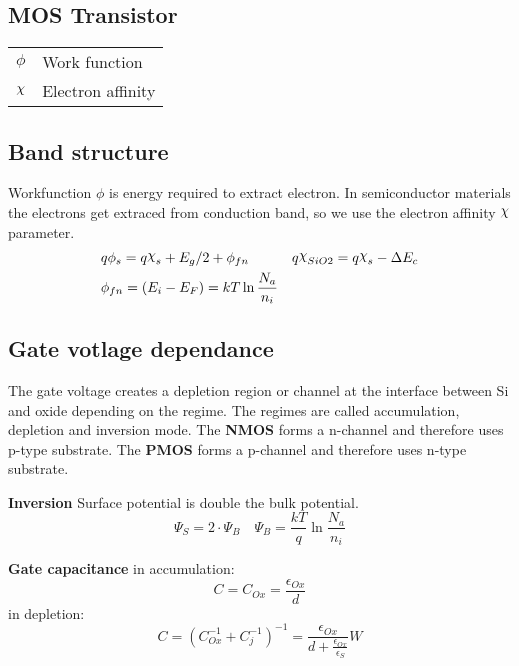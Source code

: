 \documentclass[a4paper, fontsize=8pt, landscape, DIV=1]{scrartcl}
\begin{document}
\begin{multicols*}{4}
    \section{MOS Transistor}
    \ifdefined\makeultracompact
    \else
      \begin{tabular}[h]{l l}
        $\phi$   & Work function \\
        $\altchi$    & Electron affinity \\
      \end{tabular}
    \fi

    \subsection{Band structure}
    Workfunction $\phi$ is energy required to extract electron. 
    In semiconductor materials the electrons get extraced from conduction band, so we use
    the electron affinity $\altchi$ parameter.
    \begin{align*}
      &q\phi_s = q\altchi_s + E_g/2 + \phi_{fn} & q\altchi_{SiO2} = q\altchi_s - \Delta E_c \\
      &\phi_{fn} = (E_i - E_F) = kT\ln\frac{N_a}{n_i}
    \end{align*}

    \subsection{Gate votlage dependance}
    The gate voltage creates a depletion region or channel at the interface between Si and oxide depending on the regime.
    The regimes are called  accumulation,  depletion and  inversion mode.
    The \textbf{NMOS} forms a n-channel and therefore uses p-type substrate.
    The \textbf{PMOS} forms a p-channel and therefore uses n-type substrate.

    \textbf{Inversion} 
    Surface potential is double the bulk potential.
    \[\Psi_S = 2\cdot\Psi_B \quad \Psi_B = \frac{kT}{q}\ln\frac{N_a}{n_i}\]

    \textbf{Gate capacitance} 
    in accumulation:
    \[C = C_{Ox} = \frac{\epsilon_{Ox}}{d} \]
    in depletion:
    \[C = (C_{Ox}^{-1}+C_{j}^{-1})^{-1} = \frac{\epsilon_{Ox}}{d + \frac{\epsilon_{Ox}}{\epsilon_S}}W \]


\end{multicols*}
\end{document}
